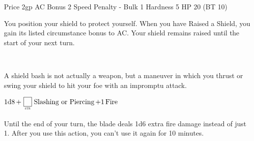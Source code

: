 \documentclass[paper=63mm:88mm, DIV=21, fontsize=7.5pt]{scrartcl}
\begin{document}
Price 2gp
AC Bonus 2
Speed Penalty -
Bulk 1
Hardness 5
HP 20 (BT 10)



You position your shield to protect yourself. When you have Raised a Shield, you gain its listed circumstance bonus to AC. Your shield remains raised until the start of your next turn.


\\

A shield bash is not actually a weapon, but a maneuver in which you thrust or swing your shield to hit your foe with an impromptu attack.





\(\operatorname{1d8} + \FormulaVariable{str}{\phantom{1}} \DamageType{Slashing or Piercing} + 1 \DamageType{Fire}\)



Until the end of your turn, the blade deals 1d6 extra fire damage instead of just 1. After you use this action, you can't use it again for 10 minutes.

\vfill

\\
\end{document}
